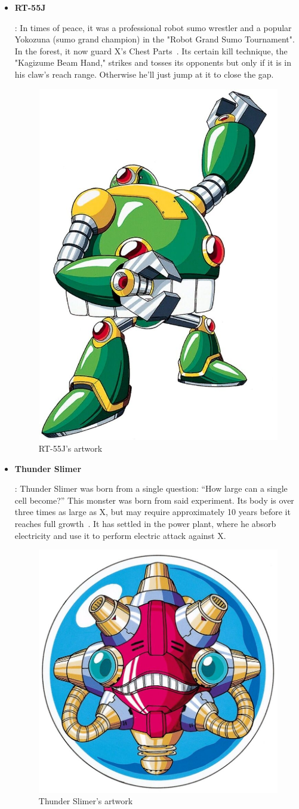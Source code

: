 \begin{itemize}
		\item \hypertarget{miniboss:RT-55J}{\textbf{RT-55J}}: In times of peace, it was a professional robot sumo wrestler and a popular Yokozuna (sumo grand champion) in the "Robot Grand Sumo Tournament". In the forest, it now guard X's  Chest Parts~\cite{wayback:X_resources}. Its certain kill technique, the "Kagizume Beam Hand," strikes and tosses its opponents but only if it is in his claw's reach range. Otherwise he'll just jump at it to close the gap.
		\begin{figure}[htp]
			\centering
			\includegraphics[width=0.4\linewidth]{figures/X1/enemies/RT-55J.jpg}
			\caption{RT-55J's artwork}
		\end{figure}
	
		\item \hypertarget{miniboss:Thunder_Slimer}{\textbf{Thunder Slimer}}: Thunder Slimer was born from a single question: ``How large can a single cell become?'' This monster was born from said experiment. Its body is over three times as large as X, but may require approximately 10 years before it reaches full growth~\cite{wayback:X_resources}. It has settled in the power plant, where he absorb electricity and use it to perform electric attack against X.
		\begin{figure}[htp]
			\centering
			\includegraphics[width=0.4\linewidth]{figures/X1/enemies/ThunderSlimer.jpg}
			\caption{Thunder Slimer's artwork}
		\end{figure}
	

\end{itemize}
